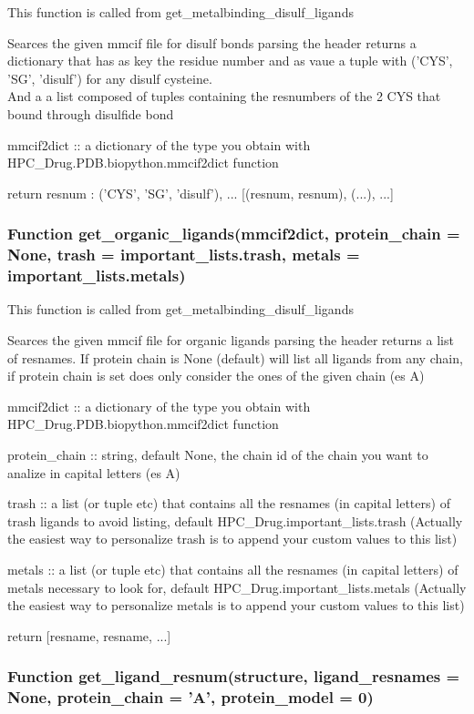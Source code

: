         This function is called from get\_metalbinding\_disulf\_ligands

        Searces the given mmcif file for disulf bonds parsing the header returns a dictionary that has as key the residue number and as vaue a tuple with ('CYS', 'SG', 'disulf') for any disulf cysteine.\\
        And a a list composed of tuples containing the resnumbers of the 2 CYS that bound through disulfide bond

        mmcif2dict :: a dictionary of the type you obtain with HPC\_Drug.PDB.biopython.mmcif2dict function

        return {resnum : ('CYS', 'SG', 'disulf'), ...}   [(resnum, resnum), (...), ...]

    \subsubsection{Function get\_organic\_ligands(mmcif2dict, protein\_chain = None, trash = important\_lists.trash, metals = important\_lists.metals)}
    
        This function is called from get\_metalbinding\_disulf\_ligands

        Searces the given mmcif file for organic ligands parsing the header returns a list of resnames. If protein chain is None (default) will list all ligands from any chain, if protein chain is set does only consider the ones of the given chain (es A)

        mmcif2dict :: a dictionary of the type you obtain with HPC\_Drug.PDB.biopython.mmcif2dict function

        protein\_chain :: string, default None, the chain id of the chain you want to analize in capital letters (es A)

        trash :: a list (or tuple etc) that contains all the resnames (in capital letters) of trash ligands to avoid listing,
        default HPC\_Drug.important\_lists.trash (Actually the easiest way to personalize trash is to append your custom values to this list)

        metals :: a list (or tuple etc) that contains all the resnames (in capital letters) of metals necessary to look for,
        default HPC\_Drug.important\_lists.metals (Actually the easiest way to personalize metals is to append your custom values to this list)

        return [resname, resname, ...]

    \subsubsection{Function get\_ligand\_resnum(structure, ligand\_resnames = None, protein\_chain = 'A', protein\_model = 0)}
    
